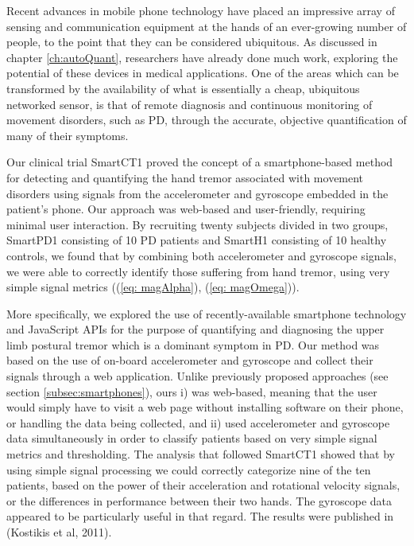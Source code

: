 Recent advances in mobile phone technology have placed an impressive array of sensing and communication equipment at the hands of an ever-growing number of people, to the point that they can be considered ubiquitous. As discussed in chapter \ref{ch:autoQuant}, researchers have already done much work, exploring the potential of these devices in medical applications. One of the areas which can be transformed by the availability of what is essentially a cheap, ubiquitous networked sensor, is that of remote diagnosis and continuous monitoring of movement disorders, such as \gls{PD}, through the accurate, objective quantification of many of their symptoms. 

Our clinical trial \gls{SmartCT1} proved the concept of a smartphone-based method for detecting and quantifying the hand tremor associated with movement disorders using signals from the accelerometer and gyroscope embedded in the patient's phone. Our approach was web-based and user-friendly, requiring minimal user interaction. By recruiting twenty subjects divided in two groups, \gls{SmartPD1} consisting of 10 \gls{PD} patients and \gls{SmartH1} consisting of 10 healthy controls, we found that by combining both accelerometer and gyroscope signals, we were able to correctly identify those suffering from hand tremor, using very simple signal metrics ((\ref{eq: magAlpha}), (\ref{eq: magOmega})). 

More specifically, we explored the use of recently-available smartphone technology and JavaScript \gls{API}s for the purpose of quantifying and diagnosing the upper limb postural tremor which is a dominant symptom in \gls{PD}. Our method was based on the use of on-board accelerometer and gyroscope and collect their signals through a web application. Unlike previously proposed approaches (see section \ref{subsec:smartphones}), ours i) was web-based, meaning that the user would simply have to visit a web page without installing software on their phone, or handling the data being collected, and ii) used accelerometer and gyroscope data simultaneously in order to classify patients based on very simple signal metrics and thresholding. The analysis that followed \gls{SmartCT1} showed that by using simple signal processing we could correctly categorize nine of the ten patients, based on the power of their acceleration and rotational velocity signals, or the differences in performance between their two hands. The gyroscope data appeared to be particularly useful in that regard. The results were published in (Kostikis et al, 2011). 

